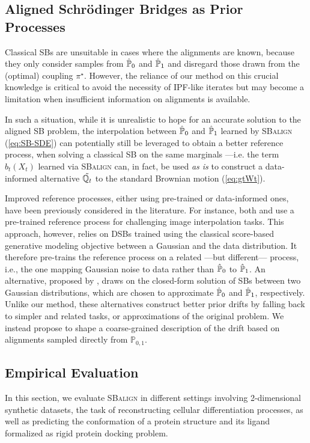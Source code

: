 \subsection{Aligned Schr\"odinger Bridges as Prior Processes}
\label{subsec:prior_drift}
Classical SBs are unsuitable in cases where the alignments are known, because they only consider samples from $\hat{\mathbb{P}}_{ {0} }$ and $\hat{\mathbb{P}}_{ {1}}$ and disregard those drawn from the (optimal) coupling $\pi^\star$. However, the reliance of our method on this crucial knowledge is critical to avoid the necessity of IPF-like iterates but may become a limitation when insufficient information on alignments is available. 

In such a situation, while it is unrealistic to hope for an accurate solution to the aligned SB problem, the interpolation between $\hat{\mathbb{P}}_{ {0} }$ and $\hat{\mathbb{P}}_{ {1}}$ learned by \textsc{SBalign} (\ref{eq:SB-SDE}) can potentially still be leveraged to obtain a better reference process, when solving a classical SB on the same marginals ---i.e. the term $b_t(X_t)$ learned via \textsc{SBalign} can, in fact, be used \textit{as is} to construct a data-informed alternative $\Tilde{\mathbb{Q}_{ t }}$ to the standard Brownian motion (\ref{eq:gtWt}).

Improved reference processes, either using pre-trained or data-informed ones, have been previously considered in the literature. 
For instance, both \citet{de2021diffusion} and \citet{chen2021likelihood} use a pre-trained reference process for challenging image interpolation tasks. This approach, however, relies on DSBs trained using the classical score-based generative modeling objective between a Gaussian and the data distribution. It therefore pre-trains the reference process on a related ---but different--- process, i.e., the one mapping Gaussian noise to data rather than $\hat{\mathbb{P}}_{ {0} }$ to $\hat{\mathbb{P}}_{ {1}}$.
An alternative, proposed by \citet{bunne2022recovering}, draws on the closed-form solution of SBs between two Gaussian distributions, which are chosen to approximate $\hat{\mathbb{P}}_{ {0} }$ and $\hat{\mathbb{P}}_{ {1}}$, respectively.
Unlike our method, these alternatives construct better prior drifts by falling back to simpler and related tasks, or approximations of the original problem. We instead propose to shape a coarse-grained description of the drift based on alignments sampled directly from $\mathbb{P}_{0,1}$. 


\subsection{Empirical Evaluation}
In this section, we evaluate \textsc{SBalign} in different settings involving 2-dimensional synthetic datasets, the task of reconstructing cellular differentiation processes, as well as predicting the conformation of a protein structure and its ligand formalized as rigid protein docking problem.

